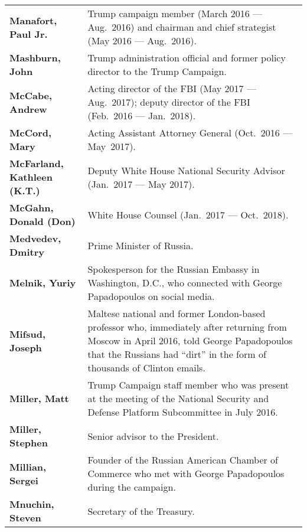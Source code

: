 \begin{longtable}{ p{} p{} }
    \textbf{Manafort, Paul Jr.} & Trump campaign member (March 2016 — Aug.~2016) and chairman and chief strategist (May 2016 — Aug.~2016). \\

    \textbf{Mashburn, John} & Trump administration official and former policy director to the Trump Campaign. \\

    \textbf{McCabe, Andrew} & Acting director of the FBI (May 2017 — Aug.~2017); deputy director of the FBI (Feb.~2016 — Jan.~2018). \\

    \textbf{McCord, Mary} & Acting Assistant Attorney General (Oct.~2016 — May~2017). \\

    \textbf{McFarland, Kathleen (K.T.)} & Deputy White House National Security Advisor (Jan.~2017 — May 2017). \\

    \textbf{McGahn, Donald (Don)} & White House Counsel (Jan.~2017 — Oct.~2018). \\

    \textbf{Medvedev, Dmitry} & Prime Minister of Russia. \\

    \textbf{Melnik, Yuriy} & Spokesperson for the Russian Embassy in Washington, D.C., who connected with George Papadopoulos on social media. \\

    \textbf{Mifsud, Joseph} & Maltese national and former London-based professor who, immediately after returning from Moscow in April 2016, told George Papadopoulos that the Russians had “dirt” in the form of thousands of Clinton emails. \\

    \textbf{Miller, Matt} & Trump Campaign staff member who was present at the meeting of the National Security and Defense Platform Subcommittee in July 2016. \\

    \textbf{Miller, Stephen} & Senior advisor to the President.  \\

    \textbf{Millian, Sergei} & Founder of the Russian American Chamber of Commerce who met with George Papadopoulos during the campaign. \\

    \textbf{Mnuchin, Steven} & Secretary of the Treasury. \\


\end{longtable}
